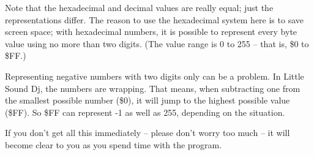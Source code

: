 Note that the hexadecimal and decimal values are really equal; just the representations differ.
The reason to use the hexadecimal system here is to save screen space; with hexadecimal
numbers, it is possible to represent every byte value using no more than two digits. (The
value range is 0 to 255 -- that is, \$0 to \$FF.)

Representing negative numbers with two digits only can be a problem. In Little Sound Dj,
the numbers are wrapping. That means, when subtracting one from the smallest possible
number (\$0), it will jump to the highest possible value (\$FF). So \$FF can represent -1 as well as 255, depending on the situation.

If you don't get all this immediately -- please don't worry too much -- it will become clear to you as you spend time with the program.



